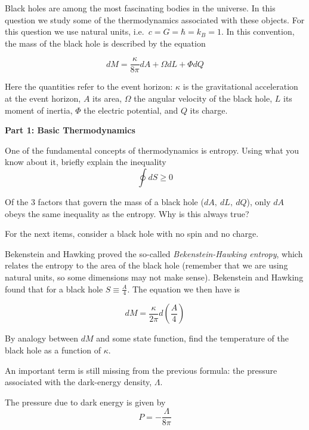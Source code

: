 \documentclass[11pt]{article}
\begin{document}
\begin{pproblem}
    Black holes are among the most fascinating bodies in the universe. In this question we study some of the thermodynamics associated with these objects. For this question we use natural units, i.e.\ \(c = G = \hbar = k_B = 1\). In this convention, the mass of the black hole is described by the equation

    \[dM = \frac{\kappa}{8\pi}dA + \Omega dL + \Phi dQ\]

    Here the quantities refer to the event horizon: \(\kappa\) is the gravitational acceleration at the event horizon, \(A\) its area, \(\Omega\) the angular velocity of the black hole, \(L\) its moment of inertia, \(\Phi\) the electric potential, and \(Q\) its charge.

    \begin{center}
    \textbf{Part 1: Basic Thermodynamics}   
    \end{center}
    
    \begin{alternativas}
        \item One of the fundamental concepts of thermodynamics is entropy. Using what you know about it, briefly explain the inequality
        \[\oint dS \geq 0\]

        \item Of the 3 factors that govern the mass of a black hole (\(dA, \ dL, \ dQ\)), only \(dA\) obeys the same inequality as the entropy. Why is this always true?
        
        For the next items, consider a black hole with no spin and no charge.

        \item Bekenstein and Hawking proved the so-called \textit{Bekenstein-Hawking entropy}, which relates the entropy to the area of the black hole (remember that we are using natural units, so some dimensions may not make sense). Bekenstein and Hawking found that for a black hole \(S \equiv \frac{A}{4}\). The equation we then have is
        
        \[dM = \frac{\kappa}{2\pi}d\left(\frac{A}{4}\right)\]

        By analogy between \(dM\) and some state function, find the temperature of the black hole as a function of \(\kappa\).

        An important term is still missing from the previous formula: the pressure associated with the dark-energy density, \(\Lambda\).

        \item The pressure due to dark energy is given by
        \[P = -\frac{\Lambda}{8\pi}\]


\end{alternativas}
\end{pproblem}
\end{document}
